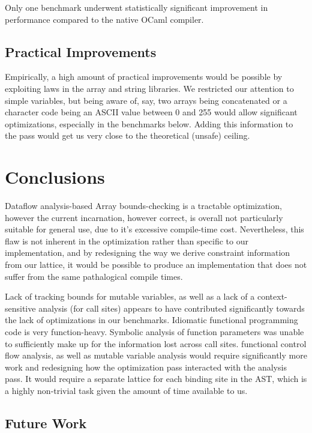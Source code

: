 \documentclass[11pt]{article}
\begin{document}
Only one benchmark underwent statistically significant improvement in performance compared to the native OCaml compiler.

\subsection{Practical Improvements}

Empirically, a high amount of practical improvements would be possible by exploiting laws in the array and string libraries. We restricted our attention to simple variables, but being aware of, say, two arrays being concatenated or a character code being an ASCII value between 0 and 255 would allow significant optimizations, especially in the benchmarks below. Adding this information to the pass would get us very close to the theoretical (unsafe) ceiling.

\section{Conclusions}

Dataflow analysis-based Array bounds-checking is a tractable optimization, however the current incarnation, however correct, is overall not particularly suitable for general use, due to it's excessive compile-time cost. Nevertheless, this flaw is not inherent in the optimization rather than specific to our implementation, and by redesigning the way we derive constraint information from our lattice, it would be possible to produce an implementation that does not suffer from the same pathalogical compile times.

Lack of tracking bounds for mutable variables, as well as a lack of a context-sensitive analysis (for call sites) appears to have contributed significantly towards the lack of optimizations in our benchmarks.
Idiomatic functional programming code is very function-heavy. Symbolic analysis of function parameters was unable to sufficiently make up for the information lost across call sites. functional control flow analysis, as well as mutable variable analysis would require significantly more work and redesigning how the optimization pass interacted with the analysis pass. It would require a separate lattice for each binding site in the AST, which is a highly non-trivial task given the amount of time available to us.

\subsection{Future Work}
\end{document}
